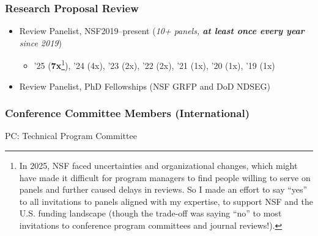 \documentclass[11pt]{article}
\begin{document}
\subsubsection{Research Proposal Review}
\begin{itemize}
    \item Review Panelist, NSF\hfill 2019--present (\emph{10+ panels, \textbf{at least once every year} since 2019})
    \begin{itemize}
    \item '25 (\textbf{7x}\footnote{In 2025, NSF faced uncertainties and organizational changes, which might have made it difficult for program managers to find people willing to serve on panels and further caused delays in reviews. So I made an effort to say ``yes'' to all invitations to panels aligned with my expertise, to support NSF and the U.S. funding landscape (though the trade-off was saying ``no'' to most invitations to conference program committees and journal reviews!).}), '24 (4x), '23 (2x), '22 (2x), '21 (1x), '20 (1x), '19 (1x)
    \end{itemize}
  \item Review Panelist, PhD Fellowships (NSF GRFP and DoD NDSEG)
\end{itemize}

\subsubsection{Conference Committee Members (International)}

\begin{description}[before=\small]
    \item PC: Technical Program Committee
\end{description}
\end{document}
